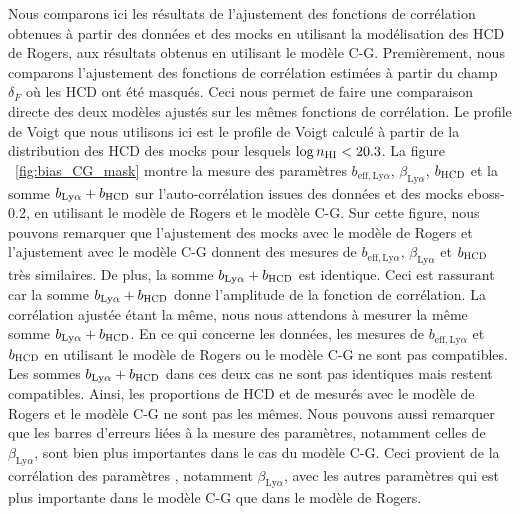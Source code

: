 \documentclass[11pt, twoside, a4paper, openright]{report}
\begin{document}
Nous comparons ici les résultats de l'ajustement des fonctions de corrélation obtenues à partir des données et des mocks en utilisant la modélisation des HCD de Rogers, aux résultats obtenus en utilisant le modèle C-G.
Premièrement, nous comparons l'ajustement des fonctions de corrélation estimées à partir du champ $\delta_F$ où les HCD ont été masqués. Ceci nous permet de faire une comparaison directe des deux modèles ajustés sur les mêmes fonctions de corrélation.
Le profile de Voigt que nous utilisons ici est le profile de Voigt calculé à partir de la distribution des HCD des mocks pour lesquels $\log n_{\textsc{HI}} < \num{20.3}$.
La figure ~\ref{fig:bias_CG_mask} montre la mesure des paramètres $b_{\mathrm{eff},\mathrm{Ly}\alpha}$, $\beta_{\mathrm{Ly}\alpha}$, $b_{\textsc{HCD}}$ et la somme  $b_{\mathrm{Ly}\alpha} + b_{\textsc{HCD}}$ sur l'auto-corrélation issues des données et des mocks eboss-0.2, en utilisant le modèle de Rogers et le modèle C-G.
Sur cette figure, nous pouvons remarquer que l'ajustement des mocks avec le modèle de Rogers et l'ajustement avec le modèle C-G donnent des mesures de $b_{\mathrm{eff},\mathrm{Ly}\alpha}$, $\beta_{\mathrm{Ly}\alpha}$ et $b_{\textsc{HCD}}$ très similaires. De plus, la somme  $b_{\mathrm{Ly}\alpha} + b_{\textsc{HCD}}$ est identique.
Ceci est rassurant car la somme $b_{\mathrm{Ly}\alpha} + b_{\textsc{HCD}}$ donne l'amplitude de la fonction de corrélation. La corrélation ajustée étant la même, nous nous attendons à mesurer la même somme $b_{\mathrm{Ly}\alpha} + b_{\textsc{HCD}}$.
En ce qui concerne les données, les mesures de $b_{\mathrm{eff},\mathrm{Ly}\alpha}$ et $b_{\textsc{HCD}}$ en utilisant le modèle de Rogers ou le modèle C-G ne sont pas compatibles. Les sommes  $b_{\mathrm{Ly}\alpha} + b_{\textsc{HCD}}$ dans ces deux cas ne sont pas identiques mais restent compatibles. Ainsi, les proportions de HCD et de \lya{} mesurés avec le modèle de Rogers et le modèle C-G ne sont pas les mêmes.
Nous pouvons aussi remarquer que les barres d'erreurs liées à la mesure des paramètres, notamment celles de $\beta_{\mathrm{Ly}\alpha}$, sont bien plus importantes dans le cas du modèle C-G.
Ceci provient de la corrélation des paramètres \lya{}, notamment $\beta_{\mathrm{Ly}\alpha}$, avec les autres paramètres qui est plus importante dans le modèle C-G que dans le modèle de Rogers.
\end{document}

